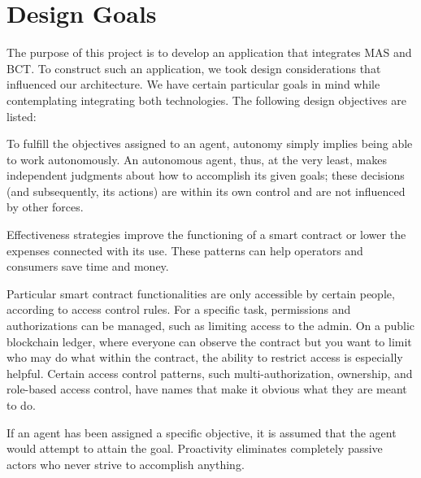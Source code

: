 \section{Design Goals}

The purpose of this project is to develop an application that integrates \ac{MAS} and \ac{BCT}. To construct such an application, we took design considerations that influenced our architecture. We have certain particular goals in mind while contemplating integrating both technologies. The following design objectives are listed:
\vspace{.5cm}
\begin{description} [style=nextline]

    \item[ $\bullet$ Autonomous]
    To fulfill the objectives assigned to an agent, autonomy simply implies being able to work autonomously. An autonomous agent, thus, at the very least, makes independent judgments about how to accomplish its given goals; these decisions (and subsequently, its actions) are within its own control and are not influenced by other forces.

    \vspace{.5cm}
    
    \item[ $\bullet$ Efficiency]
    Effectiveness strategies improve the functioning of a smart contract or lower the expenses connected with its use. These patterns can help operators and consumers save time and money.
    
    \vspace{.5cm}
    
    \item[ $\bullet$ Access Control Patterns]
    Particular smart contract functionalities are only accessible by certain people, according to access control rules. For a specific task, permissions and authorizations can be managed, such as limiting access to the admin. On a public blockchain ledger, where everyone can observe the contract but you want to limit who may do what within the contract, the ability to restrict access is especially helpful. Certain access control patterns, such multi-authorization, ownership, and role-based access control, have names that make it obvious what they are meant to do.
    
    \vspace{.5cm}
    
    \item[ $\bullet$ Goal-directed behaviour]
    If an agent has been assigned a specific objective, it is assumed that the agent would attempt to attain the goal. Proactivity eliminates completely passive actors who never strive to accomplish anything.


\end{description}
